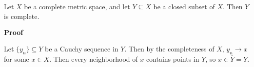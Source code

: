 \documentclass[12pt]{article}
\begin{document}
Let $X$ be a complete metric space, and let $Y \subseteq X$ be a closed subset of $X$. Then $Y$ is complete.

{\bf Proof}

Let $\{ y_n \} \subseteq Y$ be a Cauchy sequence in $Y$. Then by the completeness of $X$, $y_n \rightarrow x$ for some $x \in X$. Then every neighborhood of $x$ contains points in $Y$, so $x \in \overline Y = Y$.
\end{document}

